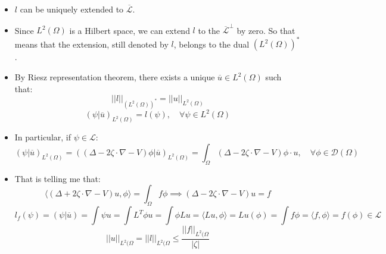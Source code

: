 \documentclass{article}
\begin{document}
\begin{itemize}
\begin{itemize}
        \item $l$ can be uniquely extended to $\overline{\mathcal{L}}$.

        \item Since $L^2(\Omega) $ is a Hilbert space, we can extend $l$ to the $\overline{\mathcal{L}}^\perp $ by zero. So that means that the extension, still denoted by $l$, belongs to the dual $(L^2(\Omega))^*$.

        \item By Riesz representation theorem, there exists a unique $\overline{u} \in L^2(\Omega)$ such that:
        \begin{equation}
            || l ||_{(L^2(\Omega))^*} = || u ||_{L^2(\Omega)} 
        \end{equation}
        \begin{equation}
            (\psi | \overline{u})_{L^2(\Omega)} = l(\psi), \quad \forall \psi \in L^2(\Omega)
        \end{equation}

        \item In particular, if $\psi \in \mathcal{L}$:
        \begin{equation}
            (\psi | \overline{u})_{L^2(\Omega)} = ((\Delta -2\zeta \cdot \nabla - V)\phi | \overline{u})_{L^2(\Omega)} = \int_\Omega (\Delta -2\zeta \cdot \nabla - V)\phi \cdot u, \quad \forall \phi  \in \mathcal{D}(\Omega)
        \end{equation}

        \item That is telling me that:
        \begin{equation}
            \langle (\Delta +2\zeta \cdot \nabla - V)u, \phi \rangle = \int_\Omega f \phi \implies (\Delta -2\zeta \cdot \nabla - V)u = f
        \end{equation}
        \begin{equation}
            l_f(\psi) = (\psi | \overline{u}) = \int \psi u = \int L^T \phi u = \int \phi Lu = \langle Lu, \phi \rangle = Lu(\phi) = \int f\phi = \langle f, \phi \rangle = f(\phi) \in \mathcal{L}
        \end{equation}
        \begin{equation}
            || u||_{L^2(\Omega} = || l||_{L^2(\Omega} \leq \frac{||f||_{L^2(\Omega}}{|\zeta|}
        \end{equation}
    \end{itemize}
\end{itemize}


\end{document}
